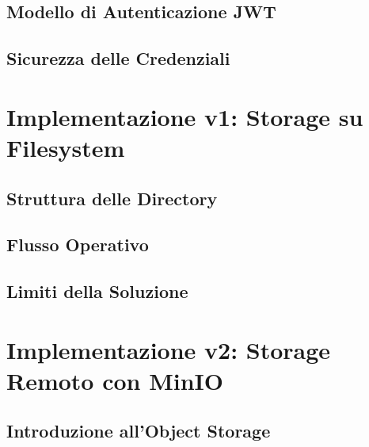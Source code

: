 \documentclass[12pt,a4paper]{report}
\begin{document}
\section{Modello di Autenticazione JWT}

\section{Sicurezza delle Credenziali}

\chapter{Implementazione v1: Storage su Filesystem}
\label{cap:v1_filesystem}

\section{Struttura delle Directory}

\section{Flusso Operativo}

\section{Limiti della Soluzione}

\chapter{Implementazione v2: Storage Remoto con MinIO}
\label{cap:v2_minio}

\section{Introduzione all'Object Storage}
\end{document}
